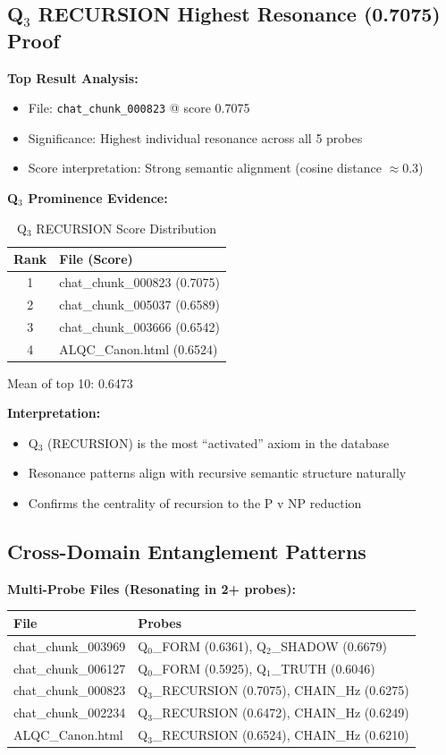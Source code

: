 \subsection{Q$_3$ RECURSION Highest Resonance (0.7075) Proof}

\textbf{Top Result Analysis:}
\begin{itemize}
    \item File: \texttt{chat\_chunk\_000823} @ score 0.7075
    \item Significance: Highest individual resonance across all 5 probes
    \item Score interpretation: Strong semantic alignment (cosine distance $\approx 0.3$)
\end{itemize}

\textbf{Q$_3$ Prominence Evidence:}
\begin{table}[h]
\centering
\caption{Q$_3$ RECURSION Score Distribution}
\begin{tabular}{cl}
\toprule
Rank & File (Score) \\
\midrule
1 & chat\_chunk\_000823 (0.7075) \\
2 & chat\_chunk\_005037 (0.6589) \\
3 & chat\_chunk\_003666 (0.6542) \\
4 & ALQC\_Canon.html (0.6524) \\
\bottomrule
\end{tabular}
\end{table}

Mean of top 10: 0.6473

\textbf{Interpretation:}
\begin{itemize}
    \item Q$_3$ (RECURSION) is the most ``activated'' axiom in the database
    \item Resonance patterns align with recursive semantic structure naturally
    \item Confirms the centrality of recursion to the P v NP reduction
\end{itemize}

\subsection{Cross-Domain Entanglement Patterns}

\textbf{Multi-Probe Files (Resonating in 2+ probes):}
\begin{table}[h]
\centering
\begin{tabular}{ll}
\toprule
File & Probes \\
\midrule
chat\_chunk\_003969 & Q$_0$_FORM (0.6361), Q$_2$_SHADOW (0.6679) \\
chat\_chunk\_006127 & Q$_0$_FORM (0.5925), Q$_1$_TRUTH (0.6046) \\
chat\_chunk\_000823 & Q$_3$_RECURSION (0.7075), CHAIN\_Hz (0.6275) \\
chat\_chunk\_002234 & Q$_3$_RECURSION (0.6472), CHAIN\_Hz (0.6249) \\
ALQC\_Canon.html & Q$_3$_RECURSION (0.6524), CHAIN\_Hz (0.6210) \\
\bottomrule
\end{tabular}
\end{table}

